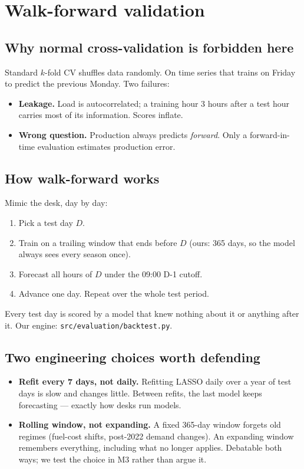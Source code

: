 \section{Walk-forward validation}

\subsection{Why normal cross-validation is forbidden here}

Standard $k$-fold CV shuffles data randomly. On time series that trains on
Friday to predict the previous Monday. Two failures:

\begin{itemize}
  \item \textbf{Leakage.} Load is autocorrelated; a training hour 3 hours
        after a test hour carries most of its information. Scores inflate.
  \item \textbf{Wrong question.} Production always predicts \emph{forward}.
        Only a forward-in-time evaluation estimates production error.
\end{itemize}

\subsection{How walk-forward works}

Mimic the desk, day by day:

\begin{enumerate}
  \item Pick a test day $D$.
  \item Train on a trailing window that ends before $D$
        (ours: 365 days, so the model always sees every season once).
  \item Forecast all hours of $D$ under the 09:00 D-1 cutoff.
  \item Advance one day. Repeat over the whole test period.
\end{enumerate}

Every test day is scored by a model that knew nothing about it or anything
after it. Our engine: \texttt{src/evaluation/backtest.py}.

\subsection{Two engineering choices worth defending}

\begin{itemize}
  \item \textbf{Refit every 7 days, not daily.} Refitting LASSO daily over a
        year of test days is slow and changes little. Between refits, the last
        model keeps forecasting --- exactly how desks run models.
  \item \textbf{Rolling window, not expanding.} A fixed 365-day window forgets
        old regimes (fuel-cost shifts, post-2022 demand changes). An expanding
        window remembers everything, including what no longer applies.
        Debatable both ways; we test the choice in M3 rather than argue it.
\end{itemize}


